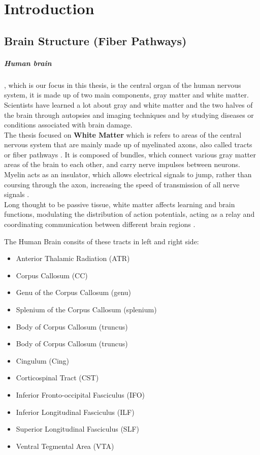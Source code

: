 \documentclass[../structure.tex]{subfiles}
\begin{document}
\chapter{Introduction}
\section{Brain Structure (Fiber Pathways)}
	\paragraph{Human brain}, which is our focus in this thesis, is the central organ of the human nervous system, it is made up of two main components, gray matter and white matter. Scientists have learned a lot about gray and white matter and the two halves of the brain through autopsies and imaging techniques and by studying diseases or conditions associated with brain damage.
	\\The thesis focused on \textbf{White Matter} which is refers to areas of the central nervous system that are mainly made up of myelinated axons, also called tracts or fiber pathways \cite{Blumenfeld2010}. It is composed of bundles, which connect various gray matter areas of the brain to each other, and carry nerve impulses between neurons. Myelin acts as an insulator, which allows electrical signals to jump, rather than coursing through the axon, increasing the speed of transmission of all nerve signals \cite{Klein2008}.
	\\Long thought to be passive tissue, white matter affects learning and brain functions, modulating the distribution of action potentials, acting as a relay and coordinating communication between different brain regions \cite{Fields2008}.
	
	The Human Brain consits of these tracts in left and right side:
    \begin{itemize}
        \item Anterior Thalamic Radiation (ATR)
        \item Corpus Callosum (CC)
        \item Genu of the Corpus Callosum (genu)
        \item Splenium of the Corpus Callosum (splenium)
        \item Body of Corpus Callosum (truncus)
        \item Body of Corpus Callosum (truncus)
		\item Cingulum (Cing)
		\item Corticospinal Tract (CST)
		\item Inferior Fronto-occipital Fasciculus (IFO)
		\item Inferior Longitudinal Fasciculus (ILF)
		\item Superior Longitudinal Fasciculus (SLF)
		\item Ventral Tegmental Area (VTA)
	\end{itemize}
\end{document}
